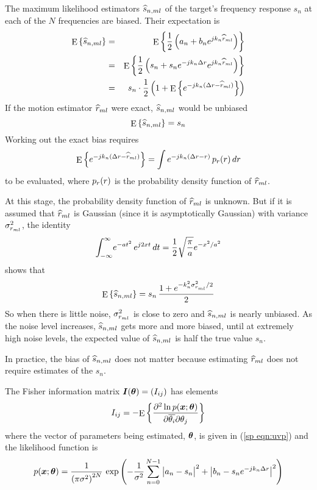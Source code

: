 The maximum likelihood estimators $\widehat{s}_{n,ml}$ of the target's frequency
response $s_n$ at each of the $N$ frequencies are biased.  Their expectation is
\begin{eqnarray}
{\mathop{\rm E}\nolimits\left\{\widehat{s}_{n,ml}\right\}}
&=&{\mathop{\rm E}\nolimits\left\{\frac{1}{2}\left(a_n+b_n{e^{jk_n\widehat{r}_{ml}}}\right)\right\}}{\nonumber}\\
&=&{\mathop{\rm E}\nolimits\left\{\frac{1}{2}\left(s_n+s_n{e^{-jk_n{\Delta r}}}{e^{jk_n\widehat{r}_{ml}}}\right)\right\}}{\nonumber}\\
&=&s_n\cdot\frac{1}{2}\left(1+{\mathop{\rm E}\nolimits\left\{{e^{-jk_n({\Delta r}-\widehat{r}_{ml})}}\right\}}\right)
\end{eqnarray}
If the motion estimator $\widehat{r}_{ml}$ were exact, $\widehat{s}_{n,ml}$ would be unbiased
\begin{equation}
{\mathop{\rm E}\nolimits\left\{\widehat{s}_{n,ml}\right\}}=s_n
\end{equation}
Working out the exact bias requires 
\begin{equation}
{\mathop{\rm E}\nolimits\left\{{e^{-jk_n({\Delta r}-\widehat{r}_{ml})}}\right\}}=\int {e^{-jk_n({\Delta r}-{r})}}\,p_r({r})\,d{r}
\end{equation}
to be evaluated, where $p_r({r})$ is the probability density function of $\widehat{r}_{ml}$.  

At this stage, the probability density function of $\widehat{r}_{ml}$ is unknown.  But if it is assumed that
$\widehat{r}_{ml}$ is Gaussian (since it is asymptotically Gaussian) with variance
$\sigma^2_{r_{ml}}$, the identity \cite[7.4.6--7]{Abr65}
\begin{equation}
{\int_{-\infty}^{\infty}} {e^{-at^2}}\,{e^{j2xt}}\,dt=\frac{1}{2}\sqrt{\frac{\pi}{a}}{e^{-x^2/a^2}}
\end{equation}
shows that
\begin{equation}
{\mathop{\rm E}\nolimits\left\{\widehat{s}_{n,ml}\right\}}=s_n\,\frac{1+{e^{-k_n^2\sigma^2_{r_{ml}}/2}}}{2}
\end{equation}
So when there is little noise, $\sigma^2_{r_{ml}}$ is close to zero and $\widehat{s}_{n,ml}$ is
nearly unbiased.  As the noise level increases, $\widehat{s}_{n,ml}$ gets more and more
biased, until at extremely high noise levels, the expected value of
$\widehat{s}_{n,ml}$ is half the true value $s_n$.

In practice, the bias of $\widehat{s}_{n,ml}$ does not matter because estimating $\widehat{r}_{ml}$
does not require estimates of the $s_n$.

\label{sp app:FIM}

\begingroup
\def\FIM#1#2{-\E{\frac{\del^2\ln p(\md;\uvp)}{\del\conj{#1}\del #2}}}
\def\FPD#1{\frac{\del\ln p(\md;\uvp)}{\del #1}}

The Fisher information matrix $\bm{I}(\bm{\theta})=(I_{ij})$ has elements
\begin{equation}
I_{ij}=\FIM{\ui{i}}{\ui{j}}
\end{equation}
where the vector of parameters being estimated, $\bm{\theta}$, is given in 
(\ref{sp eqn:uvp}) and the likelihood function is
\begin{equation}
p(\md;\uvp)=\frac{1}{\left(\pi\nv\right)^{2N}}\,\exp\left(
-\frac{1}{\nv}\sum_{n=0}^{N-1}
\left|\vphantom{\e{k}}a_n-s_n\right|^2+\left|b_n-s_n\e{-jk_n\dr}\right|^2
\right)
\end{equation}


